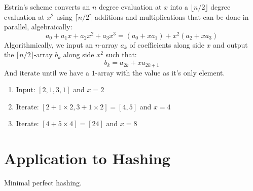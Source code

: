 Estrin's scheme converts an $n$ degree evaluation at $x$ into a $\lfloor n/2 \rfloor$ degree evaluation at $x^2$ using $\lceil n/2 \rceil$ additions and multiplications that can be done in parallel,
algebraically:
\[a_0+a_1x+a_2x^2+a_3x^3 = (a_0+xa_1)+x^2(a_2+xa_3)\]
Algorithmically,
we input an $n$-array $a_k$ of coefficients along side $x$ and output the $\lceil n/2 \rceil$-array $b_k$ along side $x^2$ such that:
\[b_k = a_{2k}+xa_{2k+1}\]
And iterate until we have a $1$-array with the value as it's only element.

\begin{enumerate}
	\item Input: $[2,1,3,1]$ and $x=2$
	\item Iterate: $[2+1\times2,3+1\times2] = [4,5]$ and $x=4$
	\item Iterate: $[4+5\times4] = [24]$ and $x=8$
\end{enumerate}

\section{Application to Hashing}
Minimal perfect hashing.
